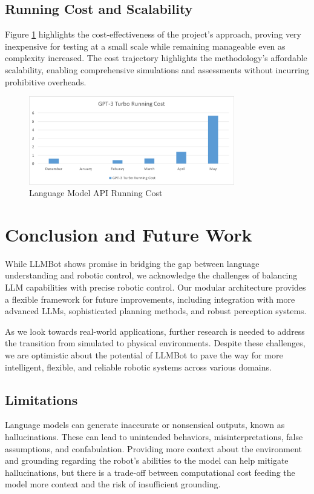\documentclass[pdflatex,sn-mathphys-num]{sn-jnl}
\theoremstyle{thmstyleone}
\theoremstyle{thmstyletwo}%
\theoremstyle{thmstylethree}%
\begin{document}
\subsection{Running Cost and Scalability}
Figure \ref{running-cost} highlights the cost-effectiveness of the project's approach, proving very inexpensive for testing at a small scale while remaining manageable even as complexity increased. The cost trajectory highlights the methodology's affordable scalability, enabling comprehensive simulations and assessments without incurring prohibitive overheads.

\begin{figure}[H]
\centering
\includegraphics[width=0.8\textwidth]{figures/running_cost.png}
\caption{Language Model API Running Cost}\label{running-cost}
\end{figure}




\section{Conclusion and Future Work}


While LLMBot shows promise in bridging the gap between language understanding and robotic control, we acknowledge the challenges of balancing LLM capabilities with precise robotic control. Our modular architecture provides a flexible framework for future improvements, including integration with more advanced LLMs, sophisticated planning methods, and robust perception systems. \cite{brohan2023rt2}

As we look towards real-world applications, further research is needed to address the transition from simulated to physical environments. Despite these challenges, we are optimistic about the potential of LLMBot to pave the way for more intelligent, flexible, and reliable robotic systems across various domains.

\subsection{Limitations}
Language models can generate inaccurate or nonsensical outputs, known as hallucinations. These can lead to unintended behaviors, misinterpretations, false assumptions, and confabulation. Providing more context about the environment and grounding regarding the robot's abilities to the model can help mitigate hallucinations, but there is a trade-off between computational cost feeding the model more context and the risk of insufficient grounding.
\end{document}
